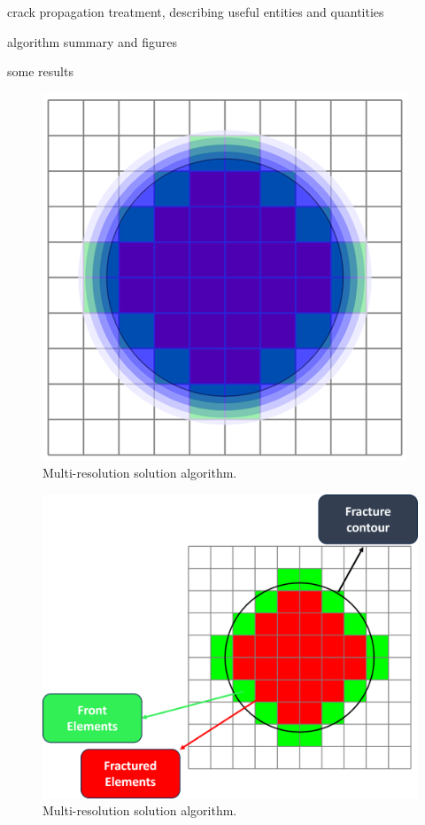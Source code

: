 crack propagation treatment, describing useful entities and quantities

algorithm summary and figures

some results

\begin{figure}[h]
    \centering
    \includegraphics[width=0.5\linewidth]{Chapter4/figures/blue_circle.png}
    \caption{Multi-resolution solution algorithm.}
    \label{fig:lorem1}
\end{figure}


\begin{figure}[h]
    \centering
    \includegraphics[width=\linewidth]{Chapter4/figures/penny_with_descriptions.png}
    \caption{Multi-resolution solution algorithm.}
    \label{fig:lorem4}
\end{figure}

